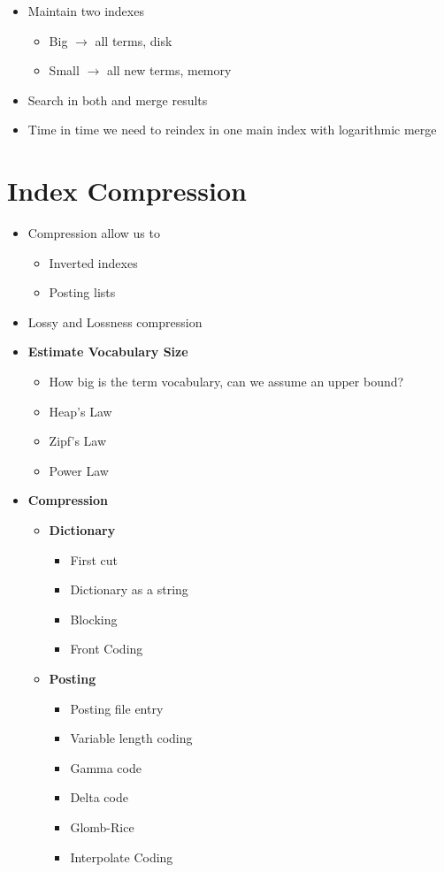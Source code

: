 \begin{itemize}
\begin{itemize}
        \item Maintain two indexes
        \begin{itemize}
            \item Big \(\rightarrow\) all terms, disk
            \item Small \(\rightarrow\) all new terms, memory
        \end{itemize}
        \item Search in both and merge results
        \item Time in time we need to reindex in one main index with logarithmic merge
    \end{itemize}
\end{itemize}

\chapter{Index Compression}
\begin{itemize}
    \item Compression allow us to
    \begin{itemize}
        \item Inverted indexes
        \item Posting lists
    \end{itemize}
    \item Lossy and Lossness compression
    \item \textbf{Estimate Vocabulary Size}
    \begin{itemize}
        \item How big is the term vocabulary, can we assume an upper bound?
        \item Heap's Law
        \item Zipf's Law
        \item Power Law
    \end{itemize}
    \item \textbf{Compression}
    \begin{itemize}
        \item \textbf{Dictionary}
        \begin{itemize}
            \item First cut
            \item Dictionary as a string
            \item Blocking
            \item Front Coding
        \end{itemize}
        \item \textbf{Posting}
        \begin{itemize}
            \item Posting file entry
            \item Variable length coding
            \item Gamma code
            \item Delta code
            \item Glomb-Rice
            \item Interpolate Coding
        \end{itemize}
    \end{itemize}
\end{itemize}

